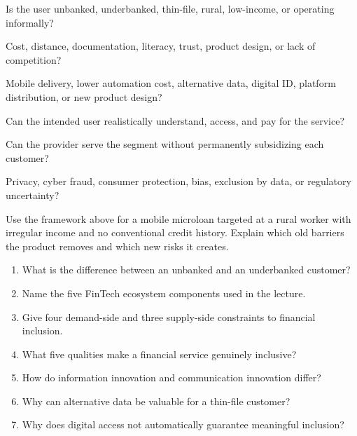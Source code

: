 \begin{mlsteps}
  \item {} Is the user unbanked, underbanked, thin-file, rural, low-income, or operating informally?
  \item {} Cost, distance, documentation, literacy, trust, product design, or lack of competition?
  \item {} Mobile delivery, lower automation cost, alternative data, digital ID, platform distribution, or new product design?
  \item {} Can the intended user realistically understand, access, and pay for the service?
  \item {} Can the provider serve the segment without permanently subsidizing each customer?
  \item {} Privacy, cyber fraud, consumer protection, bias, exclusion by data, or regulatory uncertainty?
\end{mlsteps}

\begin{tryit}
Use the framework above for a mobile microloan targeted at a rural worker with irregular income and no conventional credit history. Explain which old barriers the product removes and which new risks it creates.
\end{tryit}

\begin{quickcheck}
\begin{enumerate}
  \item What is the difference between an unbanked and an underbanked customer?
  \item Name the five FinTech ecosystem components used in the lecture.
  \item Give four demand-side and three supply-side constraints to financial inclusion.
  \item What five qualities make a financial service genuinely inclusive?
  \item How do information innovation and communication innovation differ?
  \item Why can alternative data be valuable for a thin-file customer?
  \item Why does digital access not automatically guarantee meaningful inclusion?
\end{enumerate}
\end{quickcheck}


